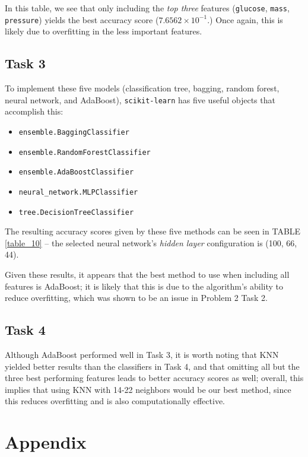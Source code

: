 \documentclass[twoside,twocolumn,10pt]{revtex4-1}
\begin{document}
	In this table, we see that only including the \textit{top three} features (\texttt{glucose}, \texttt{mass}, \texttt{pressure}) yields the best accuracy score ($7.6562 \times 10^{-1}$.) Once again, this is likely due to overfitting in the less important features.
	
	\subsection*{Task 3}
	
	To implement these five models (classification tree, bagging, random forest, neural network, and AdaBoost), \texttt{scikit-learn} has five useful objects that accomplish this:
	
	\begin{itemize}
	\item \texttt{ensemble.BaggingClassifier}
	\item \texttt{ensemble.RandomForestClassifier}
	\item \texttt{ensemble.AdaBoostClassifier}
	\item \texttt{neural\_network.MLPClassifier}
	\item \texttt{tree.DecisionTreeClassifier}
	\end{itemize}
	
	The resulting accuracy scores given by these five methods can be seen in TABLE \ref{table_10} – the selected neural network's \textit{hidden layer} configuration is (100, 66, 44). 
	
	Given these results, it appears that the best method to use when including all features is AdaBoost; it is likely that this is due to the algorithm's ability to reduce overfitting, which was shown to be an issue in Problem 2 Task 2.
	
	\subsection*{Task 4}
	
	Although AdaBoost performed well in Task 3, it is worth noting that KNN yielded better results than the classifiers in Task 4, and that omitting all but the three best performing features leads to better accuracy scores as well; overall, this implies that using KNN with 14-22 neighbors would be our best method, since this reduces overfitting and is also computationally effective.
	
	\section{Appendix}
	
\end{document}
